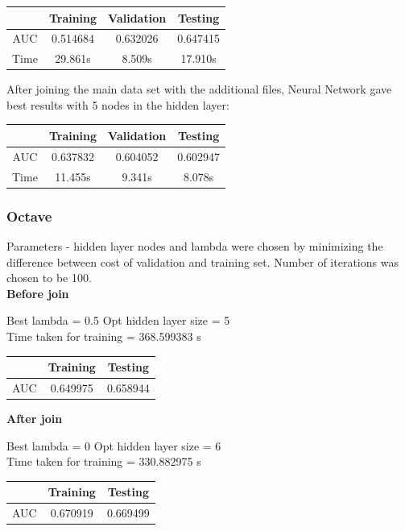 \documentclass[10pt]{article}
\begin{document}
\begin{center}
 \begin{tabular}{|c | c | c | c||} 
 \hline
 & Training & Validation & Testing\\ [0.5ex] 
 \hline\hline
AUC & 0.514684 & 0.632026 & 0.647415\\
 \hline
Time & 29.861s & 8.509s & 17.910s\\ 
 \hline
\end{tabular}
\end{center}

After joining the main data set with the additional files, Neural Network gave best results with 5 nodes in the hidden layer:\\

\begin{center}
 \begin{tabular}{|c | c | c | c||} 
 \hline
 & Training & Validation & Testing\\ [0.5ex] 
 \hline\hline
AUC & 0.637832 & 0.604052 & 0.602947\\
 \hline
Time & 11.455s & 9.341s & 8.078s\\ 
 \hline
\end{tabular}
\end{center}

\subsubsection{Octave}
Parameters - hidden layer nodes and lambda were chosen by minimizing the difference between cost of validation and training set. Number of iterations was chosen to be 100.
\\

\textbf{Before join}

	Best lambda = 0.5 Opt hidden layer size = 5 
\\

	Time taken for training = 368.599383 s

\begin{center}
 \begin{tabular}{|c | c | c ||} 
 \hline
 & Training & Testing\\ [0.5ex] 
 \hline\hline
AUC & 0.649975 & 0.658944\\
 \hline
\end{tabular}
\end{center}

\textbf{After join}

	Best lambda = 0 Opt hidden layer size = 6 
\\
	Time taken for training = 330.882975 s
\\
\begin{center}
 \begin{tabular}{|c | c | c ||} 
 \hline
 & Training & Testing\\ [0.5ex] 
 \hline\hline
AUC & 0.670919 & 0.669499\\
 \hline
\end{tabular}
\end{center}
\end{document}
